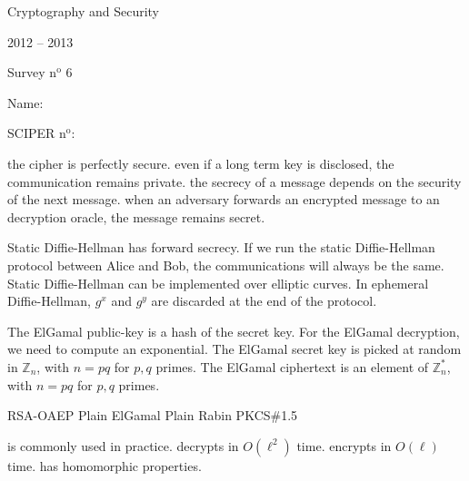 \documentclass[11pt,a4paper]{report}
\begin{document}

\begin{center}
\sf
  \Large{Cryptography and Security}

  \vspace{0.3cm}
  \Large{2012 -- 2013}

  \vspace{0.3cm}
  \Large{Survey n$^{\text{o}}$ 6}

  \vspace{0.5cm}
\end{center}

\hfill{Name:~}{\vrule width 7cm height 0.4pt}

\bigskip

\hfill{SCIPER n$^{\text{o}}$:~}{\vrule width 7cm height 0.4pt}

\begin{comment}
 \question[]{}
 {}
 {}
 {}
 {}
\end{comment}

{the cipher is perfectly secure.}               
{even if a long term key is disclosed, the communication remains private.}
{the secrecy of a message depends on the security of the next message.}
{when an adversary forwards an encrypted message to an decryption oracle, the
message remains secret.}

{Static Diffie-Hellman has forward secrecy.}
{If we run the static Diffie-Hellman protocol between Alice and Bob, the
communications will always be the same.}
{Static Diffie-Hellman can be implemented over elliptic curves.}
{In ephemeral Diffie-Hellman, $g^x$ and $g^y$ are discarded at the end of the
protocol.}
 
{The ElGamal public-key is a hash of the secret key.}
{For the ElGamal decryption, we need to compute an exponential.}
{The ElGamal secret key is picked at random in $\mathbb{Z}_n$, with $n = pq$ for
$p,q$ primes. }
{The ElGamal ciphertext is an element of $\mathbb{Z}_n^*$, with $n=pq$ for $p,q$
primes.}

{RSA-OAEP}
{Plain ElGamal}
{Plain Rabin}
{PKCS\#1.5}


{is commonly used in practice.}
{decrypts in $O(\ell^2)$ time.}
{encrypts in $O(\ell)$ time.}
{has homomorphic properties.}
\end{document}

